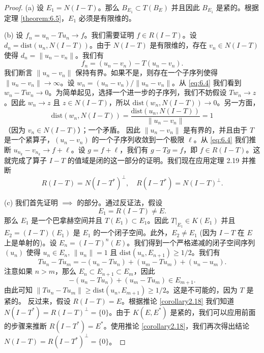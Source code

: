 \begin{proof}
(a) 设 \(E_1 = N(I-T)\)。那么 \(B_{E_1} \subset T(B_E)\) 并且因此 \(B_{E_1}\) 是紧的。根据定理 \ref{theorem:6.5}，\(E_1\) 必须是有限维的。

(b) 设 \(f_n = u_n - Tu_n \to f\)。我们需要证明 \(f \in R(I-T)\)。设 \(d_n = \mathrm{dist}(u_n, N(I-T))\)。由于 \(N(I-T)\) 是有限维的，存在 \(v_n \in N(I-T)\) 使得 \(d_n = \|u_n - v_n\|\)。我们有
\begin{equation}\label{eq:6.4}
f_n = (u_n - v_n) - T(u_n - v_n).
\end{equation}
我们断言 \(\|u_n - v_n\|\) 保持有界。如果不是，则存在一个子序列使得 \(\|u_n - v_n\| \to \infty\)。设 \(w_n = (u_n - v_n) / \|u_n - v_n\|\)。从 \eqref{eq:6.4} 我们看到 \(w_n - Tw_n \to 0\)。为简单起见，选择一个进一步的子序列，我们不妨假设 \(Tw_n \to z\)。因此 \(w_n \to z\) 且 \(z \in N(I-T)\)，所以 \(\mathrm{dist}(w_n, N(I-T)) \to 0\)。另一方面，
\[
\mathrm{dist}(w_n, N(I-T)) = \frac{\mathrm{dist}(u_n, N(I-T))}{\|u_n - v_n\|} = 1
\]
（因为 \(v_n \in N(I-T)\)）；一个矛盾。
因此 \(\|u_n-v_n\|\) 是有界的，并且由于 \(T\) 是一个紧算子，\((u_n-v_n)\) 的一个子序列收敛到一个极限 \(\ell\)。从 \eqref{eq:6.4} 我们推断 \(u_{n_k}-v_{n_k} \to f + \ell\)。设 \(g=f+\ell\)，我们有 \(g-Tg=f\)，即 \(f \in R(I-T)\)。这就完成了算子 \(I-T\) 的值域是闭的这一部分的证明。我们现在应用定理 2.19 并推断
\[
R(I-T) = N(I-T^*)^\perp, \quad R(I-T^*) = N(I-T)^\perp.
\]

(c) 我们首先证明 \(\implies\) 的部分。通过反证法，假设
\[
E_1 = R(I-T) \ne E.
\]
那么 \(E_1\) 是一个巴拿赫空间并且 \(T(E_1) \subset E_1\)。因此 \(T|_{E_1} \in K(E_1)\) 并且 \(E_2 = (I-T)(E_1)\) 是 \(E_1\) 的一个闭子空间。此外，\(E_2 \ne E_1\) (因为 \(I-T\) 在 \(E\) 上是单射的)。设 \(E_n = (I-T)^n(E)\)。我们得到一个严格递减的闭子空间序列 \((u_n)\) 使得 \(u_n \in E_n\), \(\|u_n\|=1\) 且 \(\mathrm{dist}(u_n, E_{n+1}) \ge 1/2\)。我们有
\[
Tu_n - Tu_m = -(u_n - Tu_n) + (u_m - Tu_m) + (u_n-u_m).
\]
注意如果 \(n>m\)，那么 \(E_n \subset E_{n+1} \subset E_m\)，因此
\[
-(u_n-Tu_n) + (u_m-Tu_m) \in E_{m+1}.
\]
由此可知 \(\|Tu_n - Tu_m\| \ge \mathrm{dist}(u_n, E_{m+1}) \ge 1/2\)。这是不可能的，因为 \(T\) 是紧的。
反过来，假设 \(R(I-T)=E\)。根据推论 \ref{corollary2.18} 我们知道 \(N(I-T^*) = R(I-T)^\perp = \{0\}\)。由于 \(K(E,E^*)\) 是紧的，我们可以应用前面的步骤来推断 \(R(I-T^*) = E^*\)。使用推论 \ref{corollary2.18}，我们再次得出结论 \(N(I-T)=R(I-T^*)^\perp=\{0\}\)。


\end{proof}
